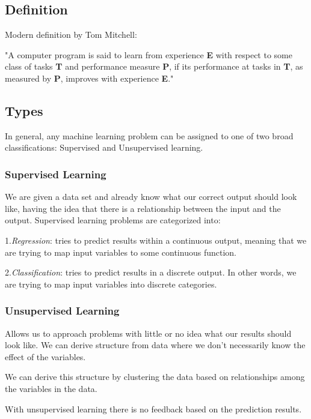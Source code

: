 \subsection{Definition}

Modern definition by Tom Mitchell: 
\begin{displayquote}
"A computer program is said to learn from experience \textbf{E} with respect to some class of tasks \textbf{T} and performance measure \textbf{P}, if its performance at tasks in \textbf{T}, as measured by \textbf{P}, improves with experience \textbf{E}."
\end{displayquote}

\subsection{Types}
In general, any machine learning problem can be assigned to one of two broad classifications: Supervised and Unsupervised learning.

\subsubsection{Supervised Learning}
We are given a data set and already know what our correct output should look like, having the idea that there is a relationship between the input and the output.
Supervised learning problems are categorized into:

1.\textit{Regression}: tries to predict results within a continuous output, meaning that we are trying to map input variables to some continuous function.

2.\textit{Classification}: tries to predict results in a discrete output. In other words, we are trying to map input variables into discrete categories.

\subsubsection{Unsupervised Learning}
Allows us to approach problems with little or no idea what our results should look like. We can derive structure from data where we don't necessarily know the effect of the variables.

We can derive this structure by clustering the data based on relationships among the variables in the data.

With unsupervised learning there is no feedback based on the prediction results.